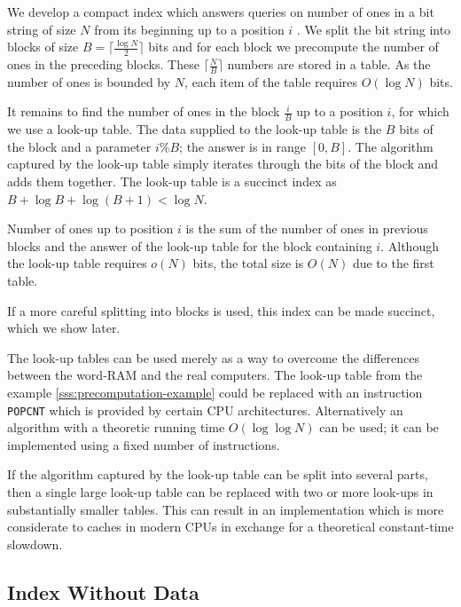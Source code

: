 \begin{example}\label{sss:precomputation-example}
	We develop a compact index which answers queries on number of ones in a bit string of size $N$ from its beginning up to a position $i$ .
	We split the bit string into blocks of size $B = \lceil\frac{\log N}{2}\rceil$ bits and for each block we precompute the number of ones in the preceding blocks.
	These $\lceil \frac{N}{B} \rceil$ numbers are stored in a table.
	As the number of ones is bounded by $N$, each item of the table requires $O(\log N)$ bits.
	
	It remains to find the number of ones in the block $\frac{i}{B}$ up to a position $i$, for which we use a look-up table.
	The data supplied to the look-up table is the $B$ bits of the block and a parameter $i \% B$; the answer is in range $[0, B]$.
	The algorithm captured by the look-up table simply iterates through the bits of the block and adds them together.
	The look-up table is a succinct index as $B + \log B + \log (B + 1) < \log N$.
	
	Number of ones up to position $i$ is the sum of the number of ones in previous blocks and the answer of the look-up table for the block containing $i$.
	Although the look-up table requires $o(N)$ bits, the total size is $O(N)$ due to the first table.
	
	If a more careful splitting into blocks is used, this index can be made succinct, which we show later.
\end{example}

\bigbreak

The look-up tables can be used merely as a way to overcome the differences between the word-RAM and the real computers.
The look-up table from the example \ref{sss:precomputation-example} could be replaced with an instruction \verb|POPCNT| which is provided by certain CPU architectures.
Alternatively an algorithm with a theoretic running time $O(\log \log N)$ can be used; it can be implemented using a fixed number of instructions.

If the algorithm captured by the look-up table can be split into several parts, then a single large look-up table can be replaced with two or more look-ups in substantially smaller tables.
This can result in an implementation which is more considerate to caches in modern CPUs in exchange for a theoretical constant-time slowdown.

\subsection{\label{ss:index-without-data}Index Without Data}

